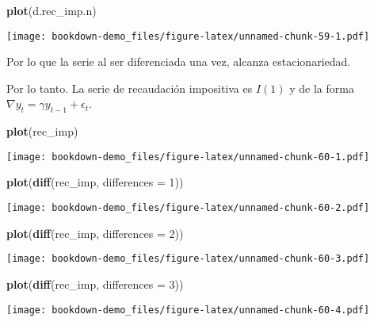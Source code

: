 \documentclass[]{book}
\newenvironment{Shaded}{\begin{snugshade}}{\end{snugshade}}
\newcommand{\KeywordTok}[1]{\textcolor[rgb]{0.13,0.29,0.53}{\textbf{#1}}}
\newcommand{\DataTypeTok}[1]{\textcolor[rgb]{0.13,0.29,0.53}{#1}}
\newcommand{\DecValTok}[1]{\textcolor[rgb]{0.00,0.00,0.81}{#1}}
\newcommand{\NormalTok}[1]{#1}
\theoremstyle{definition}
\theoremstyle{definition}
\theoremstyle{definition}
\theoremstyle{remark}
\begin{document}
\begin{Shaded}
\begin{Highlighting}[]
\KeywordTok{plot}\NormalTok{(d.rec_imp.n)}
\end{Highlighting}
\end{Shaded}

\texttt{[image: bookdown-demo\_files/figure-latex/unnamed-chunk-59-1.pdf]}

Por lo que la serie al ser diferenciada una vez, alcanza
estacionariedad.

Por lo tanto. La serie de recaudación impositiva es \(I(1)\) y de la
forma \(\nabla y_t = \gamma y_{t-1}+ \epsilon_t\).

\begin{Shaded}
\begin{Highlighting}[]
\KeywordTok{plot}\NormalTok{(rec_imp)}
\end{Highlighting}
\end{Shaded}

\texttt{[image: bookdown-demo\_files/figure-latex/unnamed-chunk-60-1.pdf]}

\begin{Shaded}
\begin{Highlighting}[]
\KeywordTok{plot}\NormalTok{(}\KeywordTok{diff}\NormalTok{(rec_imp, }\DataTypeTok{differences =} \DecValTok{1}\NormalTok{))}
\end{Highlighting}
\end{Shaded}

\texttt{[image: bookdown-demo\_files/figure-latex/unnamed-chunk-60-2.pdf]}

\begin{Shaded}
\begin{Highlighting}[]
\KeywordTok{plot}\NormalTok{(}\KeywordTok{diff}\NormalTok{(rec_imp, }\DataTypeTok{differences =} \DecValTok{2}\NormalTok{))}
\end{Highlighting}
\end{Shaded}

\texttt{[image: bookdown-demo\_files/figure-latex/unnamed-chunk-60-3.pdf]}

\begin{Shaded}
\begin{Highlighting}[]
\KeywordTok{plot}\NormalTok{(}\KeywordTok{diff}\NormalTok{(rec_imp, }\DataTypeTok{differences =} \DecValTok{3}\NormalTok{))}
\end{Highlighting}
\end{Shaded}

\texttt{[image: bookdown-demo\_files/figure-latex/unnamed-chunk-60-4.pdf]}
\end{document}
